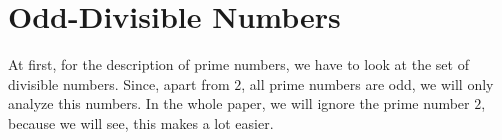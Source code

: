 \chapter{Odd-Divisible Numbers}
\label{ch:odddivisiblenumbers}
\minitoc
At first, for the description of prime numbers, we have to look at the set of divisible numbers. Since, apart from $2$, all prime numbers are odd, we will only analyze this numbers. In the whole paper, we will ignore the prime number $2$, because we will see, this makes a lot easier.
